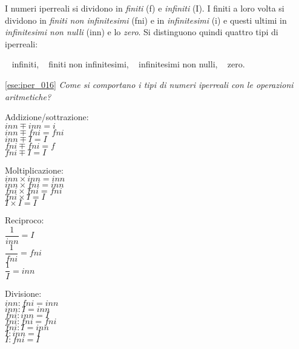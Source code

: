 I numeri iperreali si dividono in \emph{finiti} (f) e \emph{infiniti} (I). 
I finiti a loro volta si dividono in \emph{finiti non infinitesimi} (fni) e in 
\emph{infinitesimi} (i) e 
questi ultimi in \emph{infinitesimi non nulli} (inn) e lo \emph{zero}. 
Si distinguono quindi quattro tipi di iperreali: 
\begin{center}
\textbullet ~ infiniti, \qquad 
\textbullet ~ finiti non infinitesimi, \qquad 
\textbullet ~ infinitesimi non nulli, \qquad 
\textbullet ~ zero.
\end{center}

\ref{ese:iper_016} 
\emph{Come si comportano i tipi di numeri iperreali con le operazioni 
aritmetiche?}

\noindent\begin{minipage}{.30\textwidth}
 Addizione/sottrazione:\\
\(inn \mp inn = i\)\\
\(inn \mp fni = fni\)\\
\(inn \mp I = I\)\\
\(fni \mp fni = f\)\\
\(fni \mp I = I\)
\vspace{24pt}
\end{minipage}
\noindent\begin{minipage}{.25\textwidth}
 Moltiplicazione:\\
\(inn \times inn = inn\)\\
\(inn \times fni = inn\)\\
\(fni \times fni = fni\)\\
\(fni \times I = I\)\\
\(I \times I = I\)
\vspace{24pt}
\end{minipage}
\noindent\begin{minipage}{.15\textwidth}
 Reciproco:\\
\(\dfrac{1}{inn} = I\)\\
\(\dfrac{1}{fni} = fni\)\\
\(\dfrac{1}{I} = inn\)\\
\vspace{12pt}
\end{minipage}
\noindent\begin{minipage}{.25\textwidth}
 Divisione:\\
\(inn : fni = inn\)\\
\(inn : I = inn\)\\
\(fni : inn = I\)\\
\(fni : fni = fni\)\\
\(fni : I = inn\)\\
\(I : inn = I\)\\
\(I : fni = I\)
\end{minipage}

